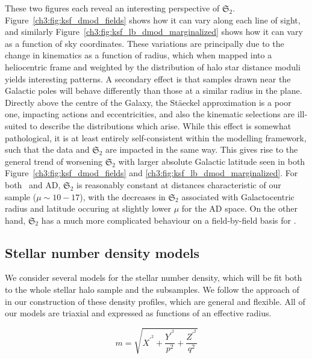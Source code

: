 These two figures each reveal an interesting perspective of $\mathfrak{S}_{2}$. Figure~\ref{ch3:fig:ksf_dmod_fields} shows how it can vary along each line of sight, and similarly Figure~\ref{ch3:fig:ksf_lb_dmod_marginalized} shows how it can vary as a function of sky coordinates. These variations are principally due to the change in kinematics as a function of radius, which when mapped into a heliocentric frame and weighted by the distribution of halo star distance moduli yields interesting patterns. A secondary effect is that samples drawn near the Galactic poles will behave differently than those at a similar radius in the plane. Directly above the centre of the Galaxy, the St\"{a}eckel approximation is a poor one, impacting actions and eccentricities, and also the kinematic selections are ill-suited to describe the distributions which arise. While this effect is somewhat pathological, it is at least entirely self-consistent within the modelling framework, such that the data and $\mathfrak{S}_{2}$ are impacted in the same way. This gives rise to the general trend of worsening $\mathfrak{S}_{2}$ with larger absolute Galactic latitude seen in both Figure~\ref{ch3:fig:ksf_dmod_fields} and \ref{ch3:fig:ksf_lb_dmod_marginalized}. For both \eLz\ and AD, $\mathfrak{S}_{2}$ is reasonably constant at distances characteristic of our sample ($\mu \sim 10-17$), with the decreases in $\mathfrak{S}_{2}$ associated with Galactocentric radius and latitude occuring at slightly lower $\mu$ for the AD space. On the other hand, $\mathfrak{S}_{2}$ has a much more complicated behaviour on a field-by-field basis for \JRLz. 

\subsection{Stellar number density models}
\label{ch3:subsec:density-models}

We consider several models for the stellar number density, which will be fit both to the whole stellar halo sample and the \gse subsamples. We follow the approach of \cite{mackereth20} in our construction of these density profiles, which are general and flexible. All of our models are triaxial and expressed as functions of an effective radius.

\begin{equation}
\label{ch3:eq:effective-radius}
m = \sqrt{ X^{\prime^{2}} + \frac{Y^{\prime^{2}}}{p^{2}} + \frac{Z^{\prime^{2}}}{q^{2}} }
\end{equation}

